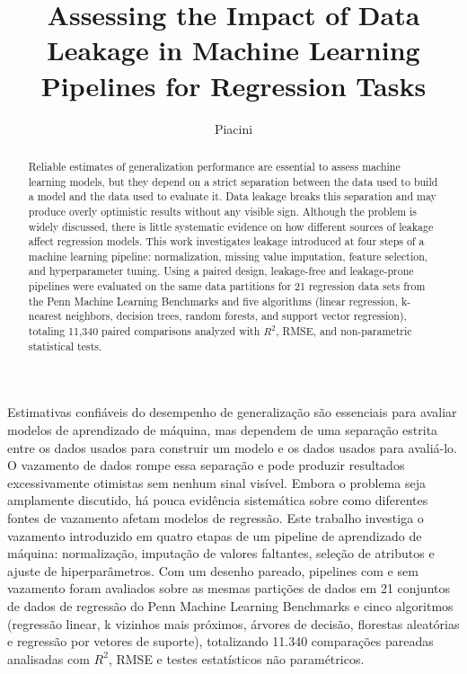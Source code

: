 \documentclass[ecp,tc,english]{infufrgs}
\title{Assessing the Impact of Data Leakage in Machine Learning Pipelines for Regression Tasks}
\author{Piacini}{Vinicius}
\begin{document}
\maketitle



\begin{abstract}
Reliable estimates of generalization performance are essential to assess machine
learning models, but they depend on a strict separation between the data used to
build a model and the data used to evaluate it. Data leakage breaks this
separation and may produce overly optimistic results without any visible sign.
Although the problem is widely discussed, there is little systematic evidence on
how different sources of leakage affect regression models. This work
investigates leakage introduced at four steps of a machine learning pipeline:
normalization, missing value imputation, feature selection, and hyperparameter
tuning. Using a paired design, leakage-free and leakage-prone pipelines were
evaluated on the same data partitions for 21 regression data sets from the Penn
Machine Learning Benchmarks and five algorithms (linear regression, k-nearest
neighbors, decision trees, random forests, and support vector regression),
totaling 11,340 paired comparisons analyzed with $R^2$, RMSE, and non-parametric
statistical tests. %
\end{abstract}

\begin{translatedabstract}
Estimativas confi\'aveis do desempenho de generaliza\c{c}\~ao s\~ao essenciais para
avaliar modelos de aprendizado de m\'aquina, mas dependem de uma separa\c{c}\~ao
estrita entre os dados usados para construir um modelo e os dados usados para
avali\'a-lo. O vazamento de dados rompe essa separa\c{c}\~ao e pode produzir
resultados excessivamente otimistas sem nenhum sinal vis\'ivel. Embora o
problema seja amplamente discutido, h\'a pouca evid\^encia sistem\'atica sobre
como diferentes fontes de vazamento afetam modelos de regress\~ao. Este trabalho
investiga o vazamento introduzido em quatro etapas de um pipeline de
aprendizado de m\'aquina: normaliza\c{c}\~ao, imputa\c{c}\~ao de valores
faltantes, sele\c{c}\~ao de atributos e ajuste de hiperpar\^ametros. Com um
desenho pareado, pipelines com e sem vazamento foram avaliados sobre as mesmas
parti\c{c}\~oes de dados em 21 conjuntos de dados de regress\~ao do Penn Machine
Learning Benchmarks e cinco algoritmos (regress\~ao linear, k vizinhos mais
pr\'oximos, \'arvores de decis\~ao, florestas aleat\'orias e regress\~ao por
vetores de suporte), totalizando 11.340 compara\c{c}\~oes pareadas analisadas
com $R^2$, RMSE e testes estat\'isticos n\~ao param\'etricos. %
\end{translatedabstract}
\end{document}
